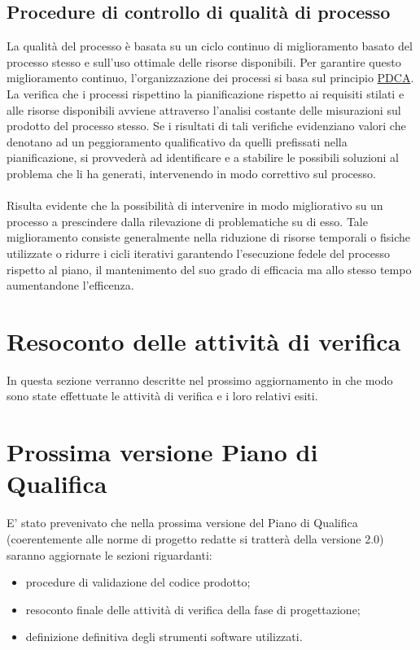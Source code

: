 \subsection{Procedure di controllo di qualità di processo}
La qualità del processo è basata su un ciclo continuo di miglioramento basato del processo stesso e sull'uso ottimale delle risorse disponibili. 
Per garantire questo miglioramento continuo, l’organizzazione dei processi si basa sul principio \underline{PDCA}. La verifica che i processi rispettino la pianificazione rispetto ai requisiti stilati e alle risorse disponibili avviene attraverso l’analisi costante delle misurazioni sul prodotto del processo stesso.
Se i risultati di tali verifiche evidenziano valori che denotano ad un peggioramento qualificativo da quelli prefissati nella pianificazione, si provvederà ad identificare e a stabilire le possibili soluzioni al problema che li ha generati, intervenendo in modo correttivo sul processo. \\\\
Risulta evidente che la possibilità di intervenire in modo migliorativo su un processo a prescindere dalla rilevazione di problematiche su di esso. Tale miglioramento consiste generalmente nella riduzione di risorse temporali o fisiche utilizzate o ridurre i cicli iterativi garantendo l'esecuzione fedele del processo rispetto al piano, il mantenimento del suo grado di efficacia ma allo stesso tempo aumentandone l'efficenza.

\clearpage
\section{Resoconto delle attività di verifica}
In questa sezione verranno descritte nel prossimo aggiornamento in che modo sono state effettuate le attività di verifica e i loro relativi esiti.

\section{Prossima versione Piano di Qualifica}
E' stato prevenivato che nella prossima versione del Piano di Qualifica (coerentemente alle norme di progetto redatte si tratterà della versione 2.0) saranno aggiornate le sezioni riguardanti:
\begin{itemize}
\item procedure di validazione del codice prodotto;
\item resoconto finale delle attività di verifica della fase di progettazione;
\item definizione definitiva degli strumenti software utilizzati.
\end{itemize}

